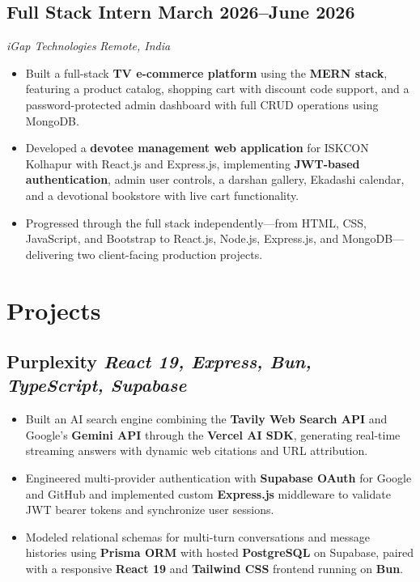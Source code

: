 \documentclass[10pt,a4paper]{article}
\begin{document}
\subsection{Full Stack Intern \hfill March 2026--June 2026}
\textit{iGap Technologies}
\hfill
\textit{Remote, India}

\begin{itemize}
    \item Built a full-stack \textbf{TV e-commerce platform} using the \textbf{MERN stack}, featuring a product catalog, shopping cart with discount code support, and a password-protected admin dashboard with full CRUD operations using MongoDB.

    \item Developed a \textbf{devotee management web application} for ISKCON Kolhapur with React.js and Express.js, implementing \textbf{JWT-based authentication}, admin user controls, a darshan gallery, Ekadashi calendar, and a devotional bookstore with live cart functionality.

    \item Progressed through the full stack independently---from HTML, CSS, JavaScript, and Bootstrap to React.js, Node.js, Express.js, and MongoDB---delivering two client-facing production projects.
\end{itemize}

\section{Projects}

\subsection{Purplexity \hfill \textit{React 19, Express, Bun, TypeScript, Supabase}}

\begin{itemize}
    \item Built an AI search engine combining the \textbf{Tavily Web Search API} and Google's \textbf{Gemini API} through the \textbf{Vercel AI SDK}, generating real-time streaming answers with dynamic web citations and URL attribution.

    \item Engineered multi-provider authentication with \textbf{Supabase OAuth} for Google and GitHub and implemented custom \textbf{Express.js} middleware to validate JWT bearer tokens and synchronize user sessions.

    \item Modeled relational schemas for multi-turn conversations and message histories using \textbf{Prisma ORM} with hosted \textbf{PostgreSQL} on Supabase, paired with a responsive \textbf{React 19} and \textbf{Tailwind CSS} frontend running on \textbf{Bun}.
\end{itemize}
\end{document}
